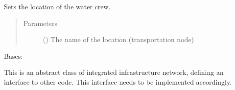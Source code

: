 \documentclass[letterpaper,10pt,english]{sphinxmanual}
\begin{document}
\begin{fulllineitems}
\begin{fulllineitems}
\begin{quote}
\begin{description}
\end{description}\end{quote}

\end{fulllineitems}


\begin{fulllineitems}
\label{\detokenize{apidoc:dreaminsg_integrated_model.src.network_sim_models.integrated_network.IntegratedNetwork.set_water_crew_loc}}
\sphinxAtStartPar
Sets the location of the water crew.
\begin{quote}\begin{description}
\item[{Parameters}] \leavevmode
\sphinxAtStartPar
{} () \textendash{} The name of the location (transportation  node)

\end{description}\end{quote}

\end{fulllineitems}


\end{fulllineitems}


\begin{fulllineitems}
\label{\detokenize{apidoc:dreaminsg_integrated_model.src.network_sim_models.integrated_network.Network}}
\sphinxAtStartPar
Bases: 

\sphinxAtStartPar
This is an abstract class of integrated infrastructure network, defining an interface to other code. This interface needs to be implemented accordingly.

\end{fulllineitems}
\end{document}
